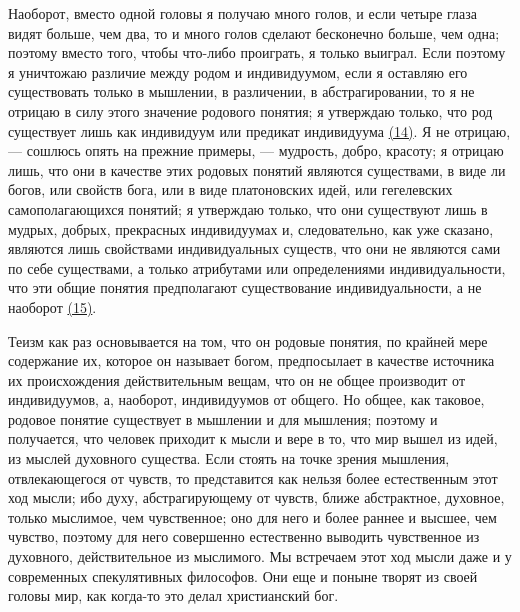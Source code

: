 \documentclass[12pt]{article}
\begin{document}
Наоборот, вместо одной головы я получаю много голов, и если четыре глаза видят больше, чем два, то и много голов сделают бесконечно больше, чем одна; поэтому вместо того, чтобы что-либо проиграть, я только выиграл. Если поэтому я уничтожаю различие между родом и индивидуумом, если я оставляю его существовать только в мышлении, в различении, в абстрагировании, то я не отрицаю в силу этого значение родового понятия; я утверждаю только, что род существует лишь как индивидуум или предикат индивидуума \hyperlink{14}{(14)}\hypertarget{b14}{}. Я не отрицаю, --- сошлюсь опять на прежние примеры, --- мудрость, добро, красоту; я отрицаю лишь, что они в качестве этих родовых понятий являются существами, в виде ли богов, или свойств бога, или в виде платоновских идей, или гегелевских самополагающихся понятий; я утверждаю только, что они существуют лишь в мудрых, добрых, прекрасных индивидуумах и, следовательно, как уже сказано, являются лишь свойствами индивидуальных существ, что они не являются сами по себе существами, а только атрибутами или определениями индивидуальности, что эти общие понятия предполагают существование индивидуальности, а не наоборот \hyperlink{15}{(15)}\hypertarget{b15}{}. 

Теизм как раз основывается на том, что он родовые понятия, по крайней мере содержание их, которое он называет богом, предпосылает в качестве источника их происхождения действительным вещам, что он не общее производит от индивидуумов, а, наоборот, индивидуумов от общего. Но общее, как таковое, родовое понятие существует в мышлении и для мышления; поэтому и получается, что человек приходит к мысли и вере в то, что мир вышел из идей, из мыслей духовного существа. Если стоять на точке зрения мышления, отвлекающегося от чувств, то представится как нельзя более естественным этот ход мысли; ибо духу, абстрагирующему от чувств, ближе абстрактное, духовное, только мыслимое, чем чувственное; оно для него и более раннее и высшее, чем чувство, поэтому для него совершенно естественно выводить чувственное из духовного, действительное из мыслимого. Мы встречаем этот ход мысли даже и у современных спекулятивных философов. Они еще и поныне творят из своей головы мир, как когда-то это делал христианский бог. 
\end{document}

